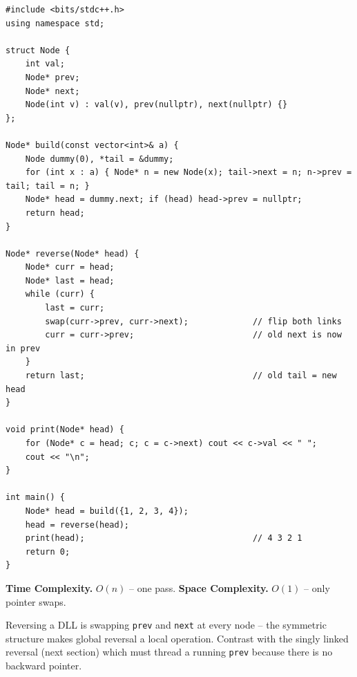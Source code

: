 \begin{lstlisting}
#include <bits/stdc++.h>
using namespace std;

struct Node {
    int val;
    Node* prev;
    Node* next;
    Node(int v) : val(v), prev(nullptr), next(nullptr) {}
};

Node* build(const vector<int>& a) {
    Node dummy(0), *tail = &dummy;
    for (int x : a) { Node* n = new Node(x); tail->next = n; n->prev = tail; tail = n; }
    Node* head = dummy.next; if (head) head->prev = nullptr;
    return head;
}

Node* reverse(Node* head) {
    Node* curr = head;
    Node* last = head;
    while (curr) {
        last = curr;
        swap(curr->prev, curr->next);             // flip both links
        curr = curr->prev;                        // old next is now in prev
    }
    return last;                                  // old tail = new head
}

void print(Node* head) {
    for (Node* c = head; c; c = c->next) cout << c->val << " ";
    cout << "\n";
}

int main() {
    Node* head = build({1, 2, 3, 4});
    head = reverse(head);
    print(head);                                  // 4 3 2 1
    return 0;
}
\end{lstlisting}

\begin{complexitybox}
\textbf{Time Complexity.} $O(n)$ -- one pass. \textbf{Space Complexity.}
$O(1)$ -- only pointer swaps.
\end{complexitybox}

\begin{takeawaybox}
Reversing a DLL is swapping \texttt{prev} and \texttt{next} at every node --
the symmetric structure makes global reversal a local operation. Contrast
with the singly linked reversal (next section) which must thread a running
\texttt{prev} because there is no backward pointer.
\end{takeawaybox}
